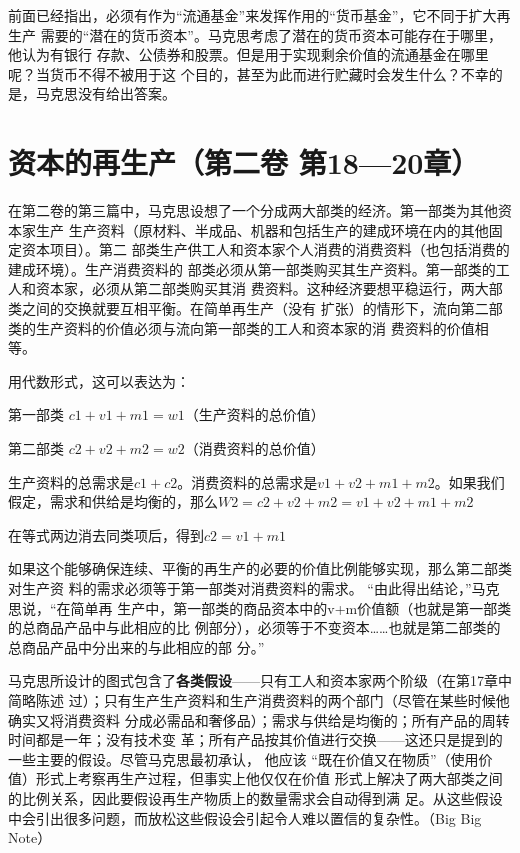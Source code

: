 前面已经指出，必须有作为“流通基金”来发挥作用的“货币基金”，它不同于扩大再生产
需要的“潜在的货币资本”。马克思考虑了潜在的货币资本可能存在于哪里，他认为有银行
存款、公债券和股票。但是用于实现剩余价值的流通基金在哪里呢？当货币不得不被用于这
个目的，甚至为此而进行贮藏时会发生什么？不幸的是，马克思没有给出答案。

\chapter{资本的再生产（第二卷 第18—20章）}
\label{chap:reproduct}

在第二卷的第三篇中，马克思设想了一个分成两大部类的经济。第一部类为其他资本家生产
生产资料（原材料、半成品、机器和包括生产的建成环境在内的其他固定资本项目）。第二
部类生产供工人和资本家个人消费的消费资料（也包括消费的建成环境）。生产消费资料的
部类必须从第一部类购买其生产资料。第一部类的工人和资本家，必须从第二部类购买其消
费资料。这种经济要想平稳运行，两大部类之间的交换就要互相平衡。在简单再生产（没有
扩张）的情形下，流向第二部类的生产资料的价值必须与流向第一部类的工人和资本家的消
费资料的价值相等。

用代数形式，这可以表达为：

第一部类 $c1+v1+m1=w1$（生产资料的总价值）

第二部类 $c2+v2+m2=w2$（消费资料的总价值）

生产资料的总需求是$c1+c2$。消费资料的总需求是$v1+v2+m1+m2$。如果我们假定，需求和供给是均衡的，那么$W2=c2+v2+m2=v1+v2+m1+m2$

在等式两边消去同类项后，得到$c2=v1+m1$

如果这个能够确保连续、平衡的再生产的必要的价值比例能够实现，那么第二部类对生产资
料的需求必须等于第一部类对消费资料的需求。 “由此得出结论，”马克思说，“在简单再
生产中，第一部类的商品资本中的v+m价值额（也就是第一部类的总商品产品中与此相应的比
例部分），必须等于不变资本……也就是第二部类的总商品产品中分出来的与此相应的部
分。” 

马克思所设计的图式包含了\textbf{各类假设}——只有工人和资本家两个阶级（在第17章中简略陈述
过）；只有生产生产资料和生产消费资料的两个部门（尽管在某些时候他确实又将消费资料
分成必需品和奢侈品）；需求与供给是均衡的；所有产品的周转时间都是一年；没有技术变
革；所有产品按其价值进行交换——这还只是提到的一些主要的假设。尽管马克思最初承认，
他应该 “既在价值又在物质”（使用价值）形式上考察再生产过程，但事实上他仅仅在价值
形式上解决了两大部类之间的比例关系，因此要假设再生产物质上的数量需求会自动得到满
足。从这些假设中会引出很多问题，而放松这些假设会引起令人难以置信的复杂性。（Big Big Note）


